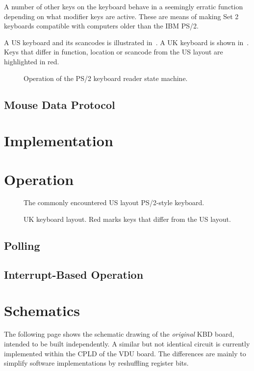 A number of other keys on the keyboard behave in a seemingly erratic function
depending on what modifier keys are active. These are means of making Set 2
keyboards compatible with computers older than the IBM PS/2.

A US keyboard and its scancodes is illustrated in~. A
UK keyboard is shown in~. Keys that differ in
function, location or scancode from the US layout are highlighted in
red.


\begin{figure}
  \centering
  
  \caption[PS/2 Set 2 State Machine
    Flowchart]{\label{fig:kbd-key-fsm-flowchart}Operation of the PS/2
    keyboard reader state machine.}
\end{figure}

\subsection{Mouse Data Protocol}

\section{Implementation}

\section{Operation}


\begin{figure}
  \centering
  
  \caption{\label{fig:kbd-us} The commonly encountered  US layout PS/2-style keyboard.}
\end{figure}

\begin{figure}
  \centering
  
  \caption{\label{fig:kbd-uk} UK keyboard layout. Red marks keys that differ from the US layout.}
\end{figure}

\subsection{Polling}

\subsection{Interrupt-Based Operation}

\section{Schematics}

The following page shows the schematic drawing of the {\em original\/} KBD
board, intended to be built independently. A similar but not identical circuit
is currently implemented within the CPLD of the VDU board. The differences are
mainly to simplify software implementations by reshuffling register bits.

\cleardoublepage
{}
